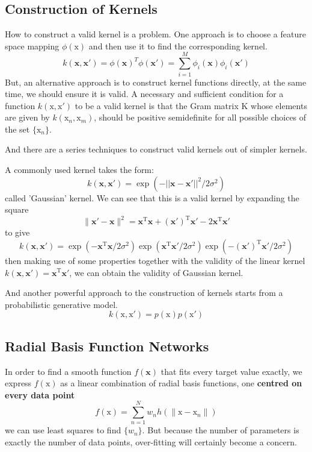\documentclass[a4paper]{book}
\newcommand{\mrm}{\mathrm}
\newcommand{\mbf}{\mathbf}
\newcommand{\xx}{\mbf x}
\newcommand{\trans}{^{\mrm T}}
\begin{document}
\subsection{ Construction of Kernels}
How to construct a valid kernel is a problem. One approach is to choose a feature space mapping $\phi(\mathrm x)$ and then use it to find the corresponding  kernel.
\begin{equation}
  k(\xx, \xx') = \phi(\xx)^T\phi(\xx') = \sum_{i=1}^M\phi_i(\xx)\phi_i(\xx')
\end{equation}
But, an alternative approach is to construct kernel functions directly, at the same time, we should ensure it is valid.  A necessary and sufficient condition for a function $k(\mathrm x, \mathrm  x') $ to be a valid kernel is that the Gram matrix $\mathrm  K$ whose elements are given by $k(\mathrm  x_n,\mathrm  x_m)$, should be positive semidefinite for all possible choices of the set $\{\mathrm  x_n\}$.

And there are a series techniques to construct valid kernels out of simpler kernels.

A commonly used kernel takes the form:
$$k(\xx,\xx') = \exp(-||\xx-\xx'||^2/2\sigma^2)$$
called 'Gaussian' kernel.  We can see that this is a valid kernel by expanding the square
\begin{equation}\label{}
  \|\xx'-\xx\|^2 =\xx\trans\xx+(\xx')\trans\xx'-2\xx\trans\xx'
\end{equation}
to give
\begin{equation}\label{}
  k(\xx,\xx')=\exp(-\xx\trans\xx/2\sigma^2)\exp(\xx\trans\xx'/2\sigma^2)\exp(-(\xx')\trans\xx'/2\sigma^2)
\end{equation}
then making use of some properties together with the validity of the linear kernel $k(\xx,\xx')=\xx\trans\xx'$, we can obtain the validity of Gaussian kernel.


And another powerful approach to the construction of kernels starts from a probabilistic generative model.  $$k(\mathrm  x,\mathrm x') = p(\mathrm  x)p(\mathrm  x')$$
\subsection{Radial Basis Function Networks}
In order to find a smooth function $f(\xx)$ that fits every target value exactly, we express $f(\mathrm{x})$ as a linear combination of radial basis functions, one \textbf{centred on every data point}
\begin{equation}
  f(\mathrm{x})  = \sum_{n=1}^{N}w_nh(\parallel\mathrm{x}-\mathrm{x}_n\parallel)
\end{equation}
we can use least squares to find $\{w_n\}$. But because the number of parameters is exactly the number of data points, over-fitting will certainly become a concern.
\end{document}
